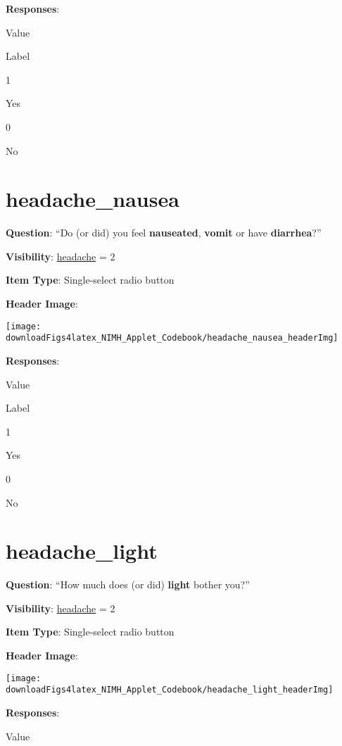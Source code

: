 \documentclass[]{book}
\begin{document}
\textbf{Responses}:

Value

Label

1

Yes

0

No

\hypertarget{headache_nausea}{%
\section{headache\_nausea}\label{headache_nausea}}

\textbf{Question}: ``Do (or did) you feel \textbf{nauseated}, \textbf{vomit} or have \textbf{diarrhea}?''

\textbf{Visibility}: \protect\hyperlink{headache}{headache} = 2

\textbf{Item Type}: Single-select radio button

\textbf{Header Image}:

\begin{flushleft}\texttt{[image: downloadFigs4latex\_NIMH\_Applet\_Codebook/headache\_nausea\_headerImg]} \end{flushleft}

\textbf{Responses}:

Value

Label

1

Yes

0

No

\hypertarget{headache_light}{%
\section{headache\_light}\label{headache_light}}

\textbf{Question}: ``How much does (or did) \textbf{light} bother you?''

\textbf{Visibility}: \protect\hyperlink{headache}{headache} = 2

\textbf{Item Type}: Single-select radio button

\textbf{Header Image}:

\begin{flushleft}\texttt{[image: downloadFigs4latex\_NIMH\_Applet\_Codebook/headache\_light\_headerImg]} \end{flushleft}

\textbf{Responses}:

Value
\end{document}
